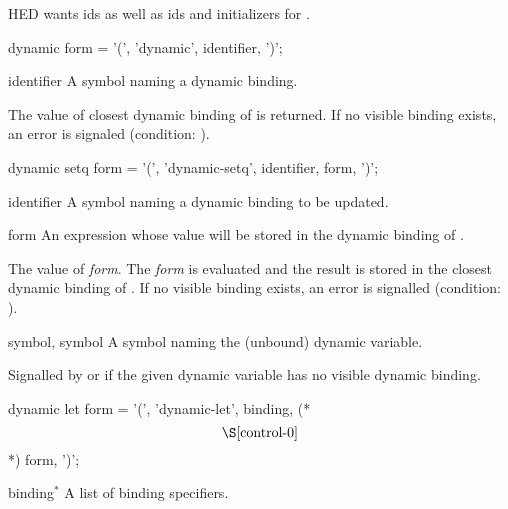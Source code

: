 \label{control-1}
%
\begin{optPrivate}
    HED wants ids as well as ids and initializers for .
\end{optPrivate}
%
\begin{optDefinition}
%
%
\Syntax
\savesyntax\dynamicSyntax\vbox{\syntax
dynamic form
   = '(', 'dynamic', identifier, ')';
\endsyntax}
%
\begin{arguments}
    \item[identifier] A symbol naming a dynamic binding.
\end{arguments}
%
\result%
The value of closest dynamic binding of  is returned.  If no
visible binding exists, an error is signaled (condition:
).

%
\Syntax
\savesyntax\dynamicSetqSyntax\vbox{\syntax
dynamic setq form
   = '(', 'dynamic-setq', identifier, form, ')';
\endsyntax}
%
\begin{arguments}
    \item[identifier] A symbol naming a dynamic binding to be updated.

    \item[form] An expression whose value will be stored in the dynamic binding
    of .
\end{arguments}
%
\result%
The value of {\em form}.
%
\remarks%
The {\em form} is evaluated and the result is stored in the closest dynamic
binding of .  If no visible binding exists, an error is
signalled (condition: 
).

%
\begin{initoptions}
    \item[symbol, symbol] A symbol naming the (unbound) dynamic variable.
\end{initoptions}
%
\remarks%
Signalled by  or  if the given
dynamic variable has no visible dynamic binding.

%
\Syntax
\savesyntax\dynamicLetSyntax\vbox{\syntax
dynamic let form
   = '(', 'dynamic-let',
     {binding}, (* \[\S\ref{control-0}\] *)
     {form}, ')';
\endsyntax}
%
\begin{arguments}
    \item[binding\/$^*$] A list of binding specifiers.


\end{arguments}
\end{optDefinition}
